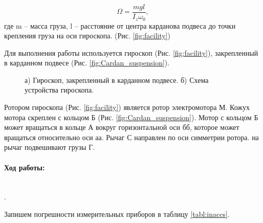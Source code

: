 \documentclass[a4paper, 12pt]{article}
\newcommand{\parag}[1]{\paragraph*{#1:}}
\newcounter{Points}
\newcommand{\point}{\arabic{Points}. \addtocounter{Points}{1}}
\begin{document}
\begin{equation}
	\Omega = \frac{mgl}{I_{z}\omega_{0}},
	\label{eq:teor_equation_omega}
\end{equation} 
где m -- масса груза, l -- расстояние от центра карданова подвеса до точки крепления груза на оси гироскопа. (Рис. \ref{fig:facility})

Для выполнения работы используется гироскоп (Рис. \ref{fig:facility}), закрепленный в карданном подвесе (Рис. \ref{fig:Cardan_suspension}).


\begin{figure}[ht!]  
	\vspace{-1ex} 
	\centering 
	\hspace{4ex}
	\caption{а) Гироскоп, закрепленный в карданном подвесе. б) Схема устройства гироскопа.}
\end{figure}

Ротором гироскопа (Рис. \ref{fig:facility}) является ротор электромотора М. Кожух мотора скреплен с кольцом Б (Рис. \ref{fig:Cardan_suspension}). Мотор с кольцом Б может вращаться в кольце А вокруг горизонтальной оси бб, которое может вращаться относительно оси аа. Рычаг С направлен по оси симметрии ротора. на рычаг подвешивают грузы Г.


\parag {Ход работы} ~\\
\point Запишем погрешности измерительных приборов в таблицу \ref{tabl:inaccs}.
\end{document}
